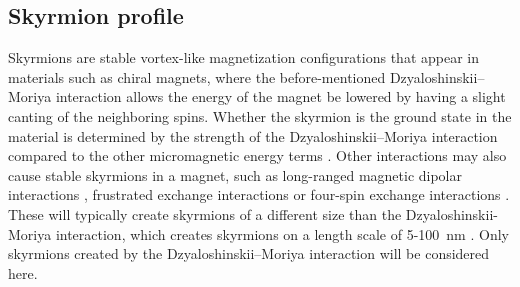 \documentclass[12pt, a4paper, twoside, openright]{article}		%
\numberwithin{equation}{section}
\begin{document}
\subsection{Skyrmion profile} \label{sec:SkyrmionProfile}
Skyrmions are stable vortex-like magnetization configurations that appear in materials such as chiral magnets, where the before-mentioned Dzyaloshinskii--Moriya interaction allows the energy of the magnet be lowered by having a slight canting of the neighboring spins. Whether the skyrmion is the ground state in the material is determined by the strength of the Dzyaloshinskii--Moriya interaction compared to the other micromagnetic energy terms \cite{Kawaguchi2015}. Other interactions may also cause stable skyrmions in a magnet, such as long-ranged magnetic dipolar interactions \cite{Lin1973}, frustrated exchange interactions \cite{Okubo2012} or four-spin exchange interactions \cite{Heinze2011}. These will typically create skyrmions of a different size than the Dzyaloshinskii-Moriya interaction, which creates skyrmions on a length scale of 5-\SI{100}{nm} \cite{Nagaosa2013}. Only skyrmions created by the Dzyaloshinskii--Moriya interaction will be considered here.
\end{document}
